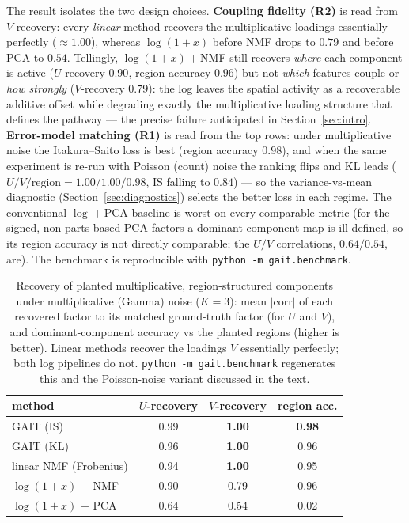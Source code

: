 \documentclass[11pt]{article}
\newcommand{\code}[1]{\texttt{#1}}
\begin{document}
The result isolates the two design choices. \textbf{Coupling fidelity (R2)} is read from
$V$-recovery: every \emph{linear} method recovers the multiplicative loadings essentially
perfectly ($\approx 1.00$), whereas $\log(1{+}x)$ before NMF drops to $0.79$ and before PCA to
$0.54$. Tellingly, $\log(1{+}x){+}$NMF still recovers \emph{where} each component is active
($U$-recovery $0.90$, region accuracy $0.96$) but not \emph{which} features couple or
\emph{how strongly} ($V$-recovery $0.79$): the log leaves the spatial activity as a
recoverable additive offset while degrading exactly the multiplicative loading structure that
defines the pathway --- the precise failure anticipated in Section~\ref{sec:intro}.
\textbf{Error-model matching (R1)} is read from the top rows: under multiplicative noise the
Itakura--Saito loss is best (region accuracy $0.98$), and when the same experiment is re-run
with Poisson (count) noise the ranking flips and KL leads ($U/V/\text{region} = 1.00/1.00/0.98$,
IS falling to $0.84$) --- so the variance-vs-mean diagnostic (Section~\ref{sec:diagnostics})
selects the better loss in each regime. The conventional $\log{+}$PCA baseline is worst on
every comparable metric (for the signed, non-parts-based PCA factors a dominant-component map
is ill-defined, so its region accuracy is not directly comparable; the $U/V$ correlations,
$0.64/0.54$, are). The benchmark is reproducible with \code{python -m gait.benchmark}.

\begin{table}[t]
  \centering
  \caption{Recovery of planted multiplicative, region-structured components under
  multiplicative (Gamma) noise ($K=3$): mean $|\text{corr}|$ of each recovered factor to its
  matched ground-truth factor (for $U$ and $V$), and dominant-component accuracy vs the
  planted regions (higher is better). Linear methods recover the loadings $V$ essentially
  perfectly; both log pipelines do not. \code{python -m gait.benchmark} regenerates this and
  the Poisson-noise variant discussed in the text.}
  \label{tab:benchmark}
  \begin{tabular}{lccc}
    \toprule
    method & $U$-recovery & $V$-recovery & region acc. \\
    \midrule
    GAIT (IS)              & 0.99 & \textbf{1.00} & \textbf{0.98} \\
    GAIT (KL)              & 0.96 & \textbf{1.00} & 0.96 \\
    linear NMF (Frobenius) & 0.94 & \textbf{1.00} & 0.95 \\
    $\log(1{+}x)$ + NMF    & 0.90 & 0.79 & 0.96 \\
    $\log(1{+}x)$ + PCA    & 0.64 & 0.54 & 0.02 \\
    \bottomrule
  \end{tabular}
\end{table}
\end{document}
